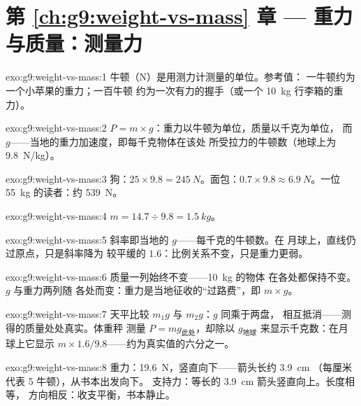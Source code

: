 \section*{第 \ref{ch:g9:weight-vs-mass} 章 --- 重力与质量：测量力}

\begin{solution}{exo:g9:weight-vs-mass:1}
牛顿（\unit{N}）是用测力计测量的单位。参考值：
一牛顿约为一个小苹果的重力；一百牛顿
约为一次有力的握手（或一个 \qty{10}{kg} 行李箱的重力）。
\end{solution}

\begin{solution}{exo:g9:weight-vs-mass:2}
$P = m \times g$：重力以牛顿为单位，质量以千克为单位，
而 $g$——当地的重力加速度，即每千克物体在该处
所受拉力的牛顿数（地球上为 \qty{9.8}{N/kg}）。
\end{solution}

\begin{solution}{exo:g9:weight-vs-mass:3}
狗：$25 \times 9.8 = \qty{245}{N}$。面包：$0.7 \times 9.8
\approx \qty{6.9}{N}$。一位 \qty{55}{kg} 的读者：约
\qty{539}{N}。
\end{solution}

\begin{solution}{exo:g9:weight-vs-mass:4}
$m = 14.7 \div 9.8 = \qty{1.5}{kg}$。
\end{solution}

\begin{solution}{exo:g9:weight-vs-mass:5}
斜率即当地的 $g$——每千克的牛顿数。在
月球上，直线仍过原点，只是斜率降为
较平缓的 $1.6$：比例关系不变，只是重力更弱。
\end{solution}

\begin{solution}{exo:g9:weight-vs-mass:6}
质量一列始终不变——\qty{10}{kg} 的物体
在各处都保持不变。$g$ 与重力两列随
各处而变：重力是当地征收的“过路费”，即 $m \times g$。
\end{solution}

\begin{solution}{exo:g9:weight-vs-mass:7}
天平比较 $m_1 g$ 与 $m_2 g$：$g$ 同乘于两盘，
相互抵消——测得的质量处处真实。体重秤
测量 $P = m g_{\text{此处}}$，却除以
$g_{\text{地球}}$ 来显示千克数：在月球上它显示
$m \times 1.6/9.8$——约为真实值的六分之一。
\end{solution}

\begin{solution}{exo:g9:weight-vs-mass:8}
重力：\qty{19.6}{N}，竖直向下——箭头长约 \qty{3.9}{cm}
（每厘米代表 5 牛顿），从书本出发向下。
支持力：等长的 \qty{3.9}{cm} 箭头竖直向上。长度相等，
方向相反：收支平衡，书本静止。
\end{solution}

